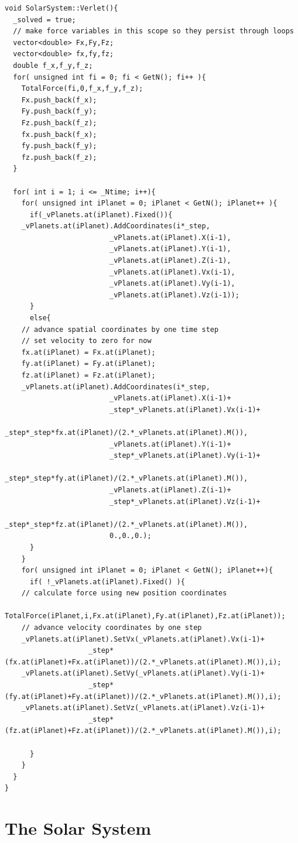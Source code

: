 \documentclass[a4paper,12pt]{report}
\begin{document}
\begin{Verbatim}[fontsize=\small]
void SolarSystem::Verlet(){
  _solved = true;
  // make force variables in this scope so they persist through loops
  vector<double> Fx,Fy,Fz;
  vector<double> fx,fy,fz;
  double f_x,f_y,f_z;
  for( unsigned int fi = 0; fi < GetN(); fi++ ){
    TotalForce(fi,0,f_x,f_y,f_z);
    Fx.push_back(f_x);
    Fy.push_back(f_y);
    Fz.push_back(f_z);
    fx.push_back(f_x);
    fy.push_back(f_y);
    fz.push_back(f_z);
  }

  for( int i = 1; i <= _Ntime; i++){
    for( unsigned int iPlanet = 0; iPlanet < GetN(); iPlanet++ ){
      if(_vPlanets.at(iPlanet).Fixed()){
	_vPlanets.at(iPlanet).AddCoordinates(i*_step,
					     _vPlanets.at(iPlanet).X(i-1),
					     _vPlanets.at(iPlanet).Y(i-1),
					     _vPlanets.at(iPlanet).Z(i-1),
					     _vPlanets.at(iPlanet).Vx(i-1),
					     _vPlanets.at(iPlanet).Vy(i-1),
					     _vPlanets.at(iPlanet).Vz(i-1));  
      }
      else{
	// advance spatial coordinates by one time step
	// set velocity to zero for now
	fx.at(iPlanet) = Fx.at(iPlanet);
	fy.at(iPlanet) = Fy.at(iPlanet);
	fz.at(iPlanet) = Fz.at(iPlanet);
	_vPlanets.at(iPlanet).AddCoordinates(i*_step,
					     _vPlanets.at(iPlanet).X(i-1)+ 
					     _step*_vPlanets.at(iPlanet).Vx(i-1)+
					     _step*_step*fx.at(iPlanet)/(2.*_vPlanets.at(iPlanet).M()),
					     _vPlanets.at(iPlanet).Y(i-1)+
					     _step*_vPlanets.at(iPlanet).Vy(i-1)+
					     _step*_step*fy.at(iPlanet)/(2.*_vPlanets.at(iPlanet).M()),
					     _vPlanets.at(iPlanet).Z(i-1)+
					     _step*_vPlanets.at(iPlanet).Vz(i-1)+
					     _step*_step*fz.at(iPlanet)/(2.*_vPlanets.at(iPlanet).M()),
					     0.,0.,0.);
      }
    }
    for( unsigned int iPlanet = 0; iPlanet < GetN(); iPlanet++){
      if( !_vPlanets.at(iPlanet).Fixed() ){
	// calculate force using new position coordinates
	TotalForce(iPlanet,i,Fx.at(iPlanet),Fy.at(iPlanet),Fz.at(iPlanet));
	// advance velocity coordinates by one step
	_vPlanets.at(iPlanet).SetVx(_vPlanets.at(iPlanet).Vx(i-1)+
				    _step*(fx.at(iPlanet)+Fx.at(iPlanet))/(2.*_vPlanets.at(iPlanet).M()),i);
	_vPlanets.at(iPlanet).SetVy(_vPlanets.at(iPlanet).Vy(i-1)+
				    _step*(fy.at(iPlanet)+Fy.at(iPlanet))/(2.*_vPlanets.at(iPlanet).M()),i);
	_vPlanets.at(iPlanet).SetVz(_vPlanets.at(iPlanet).Vz(i-1)+
				    _step*(fz.at(iPlanet)+Fz.at(iPlanet))/(2.*_vPlanets.at(iPlanet).M()),i);
	
      }
    }
  }
}
\end{Verbatim}

\section{The Solar System}\label{sec:ss}
\end{document}
